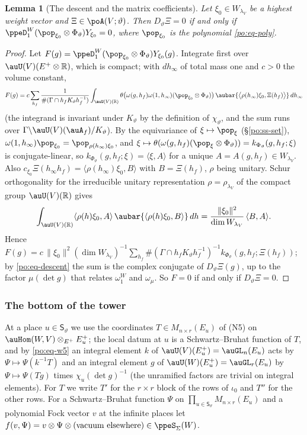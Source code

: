 \documentclass[10pt]{amsart}
\newtheorem{lemma}[theorem]{Lemma}
\theoremstyle{definition}
\theoremstyle{remark}
\newcommand{\R}{\mathbb R}
\begin{document}
\begin{lemma}[The descent and the matrix coefficients]\label{ppe:normal}
Let $\xi_0\in W_{\lambda_V}$ be a highest weight vector and $\Xi\in\poA(V;\vartheta)$. Then
$D_\vartheta\Xi=0$ if and only if $\ppeD^W_1(\pop_{\xi_0}\otimes\Phi_\vartheta)Y_{\xi_0}=0$, where
$\pop_{\xi_0}$ is the polynomial \eqref{po:eq-poly}.
\end{lemma}
\begin{proof}
Let $F(g)=\ppeD^W_1(\pop_{\xi_0}\otimes\Phi_\vartheta)Y_{\xi_0}(g)$. Integrate first over
$\auU(V)(E^+\otimes\R)$, which is compact; with $dh_\infty$ of total mass one and $c>0$ the
volume constant,
\[
F(g)=c\sum_{h_f}\frac1{\#(\Gamma\cap h_fK_\vartheta h_f^{-1})}\int_{\auU(V)(\R)}\theta\bigl(
\omega(g,h_f)\omega(1,h_\infty)(\pop_{\xi_0}\otimes\Phi_\vartheta)\bigr)\,\aubar{\bigl\langle
\rho(h_\infty)\xi_0,\Xi(h_f)\bigr\rangle}\,dh_\infty
\]
(the integrand is invariant under $K_\vartheta$ by the definition of $\chi_\vartheta$, and the sum
runs over $\Gamma\backslash\auU(V)(\auA_f)/K_\vartheta$). By the equivariance of
$\xi\mapsto\pop_\xi$ (\S\ref{po:ss-set}), $\omega(1,h_\infty)\pop_{\xi_0}=\pop_{\rho(h_\infty)
\xi_0}$, and $\xi\mapsto\theta(\omega(g,h_f)(\pop_\xi\otimes\Phi_\vartheta))=k_{\Phi_\vartheta}
(g,h_f;\xi)$ is conjugate-linear, so $k_{\Phi_\vartheta}(g,h_f;\xi)=\langle\xi,A\rangle$ for a
unique $A=A(g,h_f)\in W_{\lambda_V}$. Also $c_{\xi_0}\Xi(h_\infty h_f)=\langle\rho(h_\infty)\xi_0,
B\rangle$ with $B=\Xi(h_f)$, $\rho$ being unitary. Schur orthogonality for the irreducible unitary
representation $\rho=\rho_{\lambda_V}$ of the compact group $\auU(V)(\R)$ gives
\[
\int_{\auU(V)(\R)}\langle\rho(h)\xi_0,A\rangle\,\aubar{\langle\rho(h)\xi_0,B\rangle}\,dh=
\frac{\|\xi_0\|^2}{\dim W_{\lambda_V}}\,\langle B,A\rangle .
\]
Hence $F(g)=c\,\|\xi_0\|^2(\dim W_{\lambda_V})^{-1}\sum_{h_f}\#(\Gamma\cap h_fK_\vartheta
h_f^{-1})^{-1}k_{\Phi_\vartheta}(g,h_f;\Xi(h_f))$; by \eqref{po:eq-descent} the sum is the complex
conjugate of $D_\vartheta\Xi(g)$, up to the factor $\mu(\det g)$ that relates $\omega^W_1$ and
$\omega_\mu$. So $F=0$ if and only if $D_\vartheta\Xi=0$.
\end{proof}

\subsubsection{The bottom of the tower}\label{ppe:ss-bottom}

At a place $u\in\mathsf S_\vartheta$ we use the coordinates $T\in M_{n\times r}(E_u)$ of (N5) on
$\auHom(W,V)\otimes_{E^+}E^+_{u}$; the local datum at $u$ is a Schwartz--Bruhat function of $T$,
and by \eqref{po:eq-w5} an integral element $k$ of $\auU(V)(E^+_u)=\auGL_n(E_u)$ acts by
$\Psi\mapsto\Psi(k^{-1}T)$ and an integral element $g$ of $\auU(W)(E^+_u)=\auGL_r(E_u)$ by
$\Psi\mapsto\Psi(Tg)$ times $\chi_u(\det g)^{-1}$ (the unramified factors are trivial on integral
elements). For $T$ we write $T'$ for the $r\times r$ block of the rows of $\iota_0$ and $T''$ for
the other rows. For a Schwartz--Bruhat function $\Psi$ on $\prod_{u\in\mathsf S_\vartheta}
M_{n\times r}(E_u)$ and a polynomial Fock vector $v$ at the infinite places let
$f(v,\Psi)=v\otimes\Psi\otimes(\text{vacuum elsewhere})\in\ppeS_\Sigma(W)$.
\end{document}
